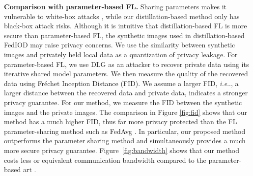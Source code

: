 \documentclass[letterpaper]{article} %
\makeatletter
\DeclareRobustCommand\onedot{\futurelet\@let@token\@onedot}
\def\@onedot{\ifx\@let@token.\else.\null\fi\xspace}
\def\ie{\emph{i.e}\onedot} \def\Ie{\emph{I.e}\onedot}
\makeatother
\begin{document}
 \textbf{Comparison with parameter-based FL.} 
Sharing parameters makes it vulnerable to white-box attacks \cite{chang2019cronus, zhu2019deep, geiping2020inverting}, while our distillation-based method only has black-box attack risks. Although it is intuitive that distillation-based FL is more secure than parameter-based FL, the synthetic images used in distillation-based FedIOD may raise privacy concerns. We use the similarity between synthetic images and privately held local data as a quantization of privacy leakage. 
For parameter-based FL, we use DLG \cite{zhu2019deep} as an attacker to recover private data using its iterative shared model parameters. We then measure the quality of the recovered data using Fréchet Inception Distance (FID). We assume a larger FID, \ie, a larger distance between the recovered data and private data, indicates a stronger privacy guarantee. For our method, we measure the FID between the synthetic images and the private images. The comparison in Figure \ref{fig:fid} shows that our method has a much higher FID, thus far more privacy protected than the FL parameter-sharing method such as FedAvg \cite{mcmahan2017communication}.  
In particular, our proposed method outperforms the parameter sharing method \cite{mcmahan2017communication} and simultaneously provides a much more secure privacy guarantee. Figure~\ref{fig:bandwidth} shows that our method costs less or equivalent communication bandwidth compared to the parameter-based art \cite{mcmahan2017communication} .
\end{document}
